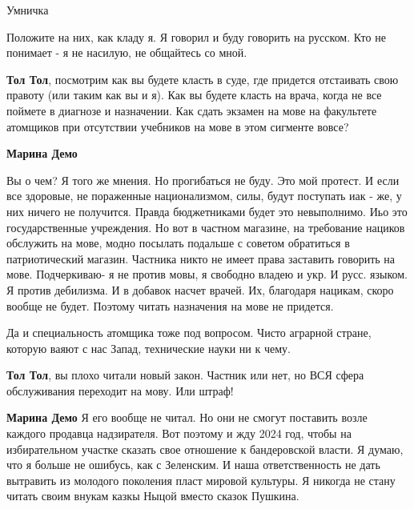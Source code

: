\begin{itemize}

Умничка


Положите на них, как кладу я. Я говорил и буду говорить на русском. Кто не
понимает - я не насилую, не общайтесь со мной.

\begin{itemize}

\textbf{Тол Тол}, посмотрим как вы будете класть в суде, где придется
отстаивать свою правоту (или таким как вы и я). Как вы будете класть на врача,
когда не все поймете в диагнозе и назначении. Как сдать экзамен на мове на
факультете атомщиков при отсутствии учебников на мове в этом сигменте вовсе?


\textbf{Марина Демо} 

Вы о чем? Я того же мнения. Но прогибаться не буду. Это мой протест. И если все
здоровые, не пораженные национализмом, силы, будут поступать иак - же, у них
ничего не получится. Правда бюджетниками будет это невыполнимо. Иьо это
государственные учреждения. Но вот в частном магазине, на требование нациков
обслужить на мове, модно посылать подальше с советом обратиться в
патриотический магазин. Частника никто не имеет права заставить говорить на
мове. Подчеркиваю- я не против мовы, я свободно владею и укр. И русс. языком. Я
против дебилизма. И в добавок насчет врачей. Их, благодаря нацикам, скоро
вообще не будет. Поэтому читать назначения на мове не придется.

Да и специальность атомщика тоже под вопросом. Чисто аграрной стране, которую
ваяют с нас Запад, технические науки ни к чему.



\textbf{Тол Тол}, вы плохо читали новый закон. Частник или нет, но ВСЯ сфера обслуживания переходит на мову. Или штраф!


\textbf{Марина Демо} Я его вообще не читал. Но они не смогут поставить возле
каждого продавца надзирателя. Вот поэтому и жду 2024 год, чтобы на
избирательном участке сказать свое отношение к бандеровской власти. Я думаю,
что я больше не ошибусь, как с Зеленским. И наша ответственность не дать
вытравить из молодого поколения пласт мировой культуры. Я никогда не стану
читать своим внукам казкы Ныцой вместо сказок Пушкина.


\end{itemize}
\end{itemize}

